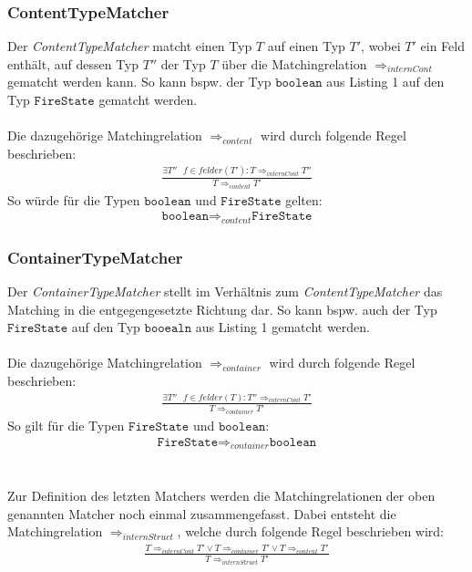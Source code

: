 \documentclass[a4paper,12pt]{article}
\begin{document}
\subsubsection{ContentTypeMatcher}
Der \emph{ContentTypeMatcher} matcht einen Typ $T$ auf einen Typ $T'$, wobei $T'$ ein Feld enthält, auf dessen Typ $T''$ der Typ $T$ über die Matchingrelation $\Rightarrow_{internCont}$ gematcht werden kann. So kann bspw. der Typ $\texttt{boolean}$ aus Listing 1 auf den Typ $\texttt{FireState}$ gematcht werden.
\\\\
Die dazugehörige Matchingrelation $\Rightarrow_{content}$ wird durch folgende Regel beschrieben:
\begin{gather*}
\frac{\exists \mathit{T''\text{ }f}\in felder(T'): T \Rightarrow_{internCont} T''}{T \Rightarrow_{content} T'}
\end{gather*}
\noindent
So würde für die Typen $\texttt{boolean}$ und $\texttt{FireState}$ gelten: 
\begin{gather*}
\texttt{boolean} \Rightarrow_{content} \texttt{FireState}
\end{gather*}
\subsubsection{ContainerTypeMatcher}
Der \emph{ContainerTypeMatcher} stellt im Verhältnis zum \emph{ContentTypeMatcher} das Matching in die entgegengesetzte Richtung dar. So kann bspw. auch der Typ $\texttt{FireState}$ auf den Typ $\texttt{booealn}$ aus Listing 1 gematcht werden.
\\\\
Die dazugehörige Matchingrelation $\Rightarrow_{container}$ wird durch folgende Regel beschrieben:
\begin{gather*}
\frac{\exists \mathit{T''\text{ }f}\in felder(T): T'' \Rightarrow_{internCont} T'}{T \Rightarrow_{container} T'}
\end{gather*}
\noindent
So gilt für die Typen $\texttt{FireState}$ und $\texttt{boolean}$: 
\begin{gather*}
\texttt{FireState} \Rightarrow_{container} \texttt{boolean}
\end{gather*}
\\\\
Zur Definition des letzten Matchers werden die Matchingrelationen der oben genannten Matcher noch einmal zusammengefasst. Dabei entsteht die Matchingrelation $\Rightarrow_{internStruct}$, welche durch folgende Regel beschrieben wird:
\begin{gather*}
\frac{T \Rightarrow_{internCont}T' \vee T \Rightarrow_{container} T' \vee T \Rightarrow_{content} T'}{T \Rightarrow_{internStruct}T'}
\end{gather*}
\end{document}
